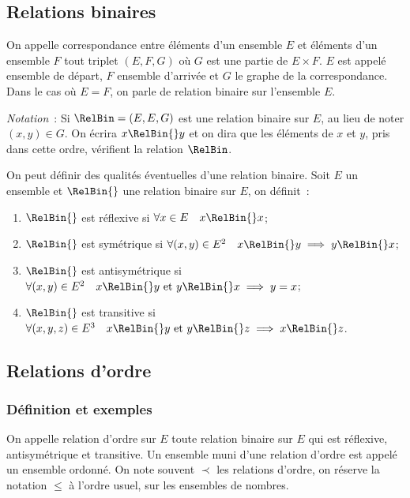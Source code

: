 \subsection{Relations binaires}
\label{chap3-subsec:relationbinaire}
\begin{defdef}
On appelle correspondance entre éléments d'un ensemble $E$ et éléments d'un ensemble $F$ tout triplet $(E,F,G)$ où $G$ est une partie de $E \times F$. $E$ est appelé ensemble de départ, $F$ ensemble d'arrivée et $G$ le graphe de la correspondance. Dans le cas où $E=F$, on parle de relation binaire sur l'ensemble $E$.
\end{defdef}
%
\emph{Notation}~: Si $\RelBin=(E,E,G)$ est une relation binaire sur $E$, au lieu de noter $(x,y) \in G$. On écrira $x\RelBin{}y$ et on dira que les éléments de $x$ et $y$, pris dans cette ordre, vérifient la relation $\RelBin$.
\begin{defdef}
On peut définir des qualités éventuelles d'une relation binaire. Soit $E$ un ensemble et $\RelBin{}$ une relation binaire sur $E$, on définit~:
\begin{enumerate}
\item $\RelBin{}$ est réflexive si $\forall x \in E \quad x\RelBin{}x$;
\item $\RelBin{}$ est symétrique si $\forall (x,y) \in E^2 \quad x\RelBin{}y \implies y\RelBin{}x$;
\item $\RelBin{}$ est antisymétrique si $\forall (x,y) \in E^2 \quad x\RelBin{}y \text{~et~} y\RelBin{}x \implies y=x$;
\item $\RelBin{}$ est transitive si $\forall (x,y,z) \in E^3 \quad x\RelBin{}y \text{~et~} y\RelBin{}z \implies x\RelBin{}z$.
\end{enumerate}
\end{defdef}
%
\subsection{Relations d'ordre}
\label{chap3-subsec:relationdordre}
\subsubsection{Définition et exemples}
\label{chap3-subsubsec:relationordredef}
\begin{defdef}
On appelle relation d'ordre sur $E$ toute relation binaire sur $E$ qui est réflexive, antisymétrique et transitive. Un ensemble muni d'une relation d'ordre est appelé un ensemble ordonné. On note souvent $\prec$ les relations d'ordre, on réserve la notation $\leq$ à l'ordre usuel, sur les ensembles de nombres.
\end{defdef}

